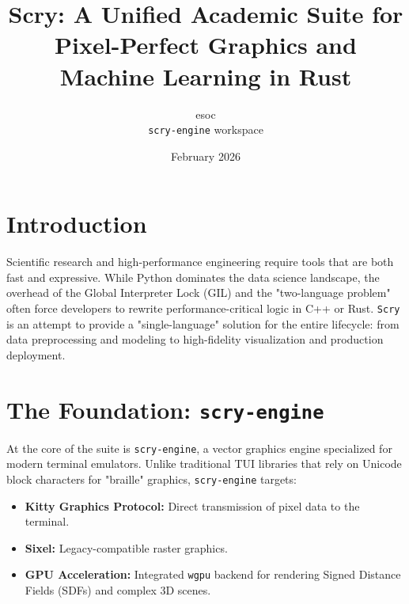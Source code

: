 \documentclass[11pt,twocolumn]{article}
\title{\textbf{Scry: A Unified Academic Suite for Pixel-Perfect Graphics and Machine Learning in Rust}}
\author{esoc \\ \texttt{scry-engine} workspace}
\date{February 2026}
\begin{document}

\section{Introduction}
Scientific research and high-performance engineering require tools that are both fast and expressive. While Python dominates the data science landscape, the overhead of the Global Interpreter Lock (GIL) and the "two-language problem" often force developers to rewrite performance-critical logic in C++ or Rust. \texttt{Scry} is an attempt to provide a "single-language" solution for the entire lifecycle: from data preprocessing and modeling to high-fidelity visualization and production deployment.

\section{The Foundation: \texttt{scry-engine}}
At the core of the suite is \texttt{scry-engine}, a vector graphics engine specialized for modern terminal emulators. Unlike traditional TUI libraries that rely on Unicode block characters for "braille" graphics, \texttt{scry-engine} targets:
\begin{itemize}
    \item \textbf{Kitty Graphics Protocol:} Direct transmission of pixel data to the terminal.
    \item \textbf{Sixel:} Legacy-compatible raster graphics.
    \item \textbf{GPU Acceleration:} Integrated \texttt{wgpu} backend for rendering Signed Distance Fields (SDFs) and complex 3D scenes.
\end{itemize}
\end{document}
